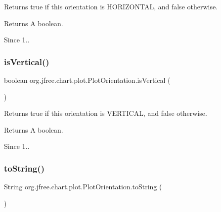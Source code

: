 Returns {\ttfamily true} if this orientation is {\ttfamily H\+O\+R\+I\+Z\+O\+N\+T\+AL}, and {\ttfamily false} otherwise. ~\newline
 \begin{DoxyReturn}{Returns}
A boolean.
\end{DoxyReturn}
\begin{DoxySince}{Since}
1.. 
\end{DoxySince}
\mbox{\label{classorg_1_1jfree_1_1chart_1_1plot_1_1_plot_orientation_a60f166f26b81bbbead6b029b7627a8df}} 
\subsubsection{\texorpdfstring{is\+Vertical()}{isVertical()}}
{\footnotesize\ttfamily boolean org.\+jfree.\+chart.\+plot.\+Plot\+Orientation.\+is\+Vertical (\begin{DoxyParamCaption}{ }\end{DoxyParamCaption})}

Returns {\ttfamily true} if this orientation is {\ttfamily V\+E\+R\+T\+I\+C\+AL}, and {\ttfamily false} otherwise.

\begin{DoxyReturn}{Returns}
A boolean.
\end{DoxyReturn}
\begin{DoxySince}{Since}
1.. 
\end{DoxySince}
\mbox{\label{classorg_1_1jfree_1_1chart_1_1plot_1_1_plot_orientation_a3fb515dcbb319b1a2c6866bbb9515e01}} 
\subsubsection{\texorpdfstring{to\+String()}{toString()}}
{\footnotesize\ttfamily String org.\+jfree.\+chart.\+plot.\+Plot\+Orientation.\+to\+String (\begin{DoxyParamCaption}{ }\end{DoxyParamCaption})}

